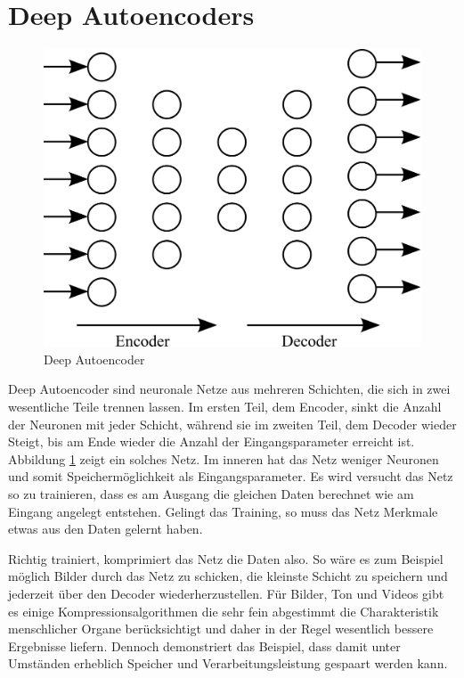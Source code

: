 \section{Deep Autoencoders}

\begin{figure}
	\centering
	\includegraphics[scale=1]{images/autoencoder.png}
	\caption{Deep Autoencoder}
	\label{fig:autoencoder}
\end{figure}

Deep Autoencoder sind neuronale Netze aus mehreren Schichten, die sich in zwei wesentliche Teile trennen lassen. Im ersten Teil, dem Encoder, sinkt die Anzahl der Neuronen mit jeder Schicht, während sie im zweiten Teil, dem Decoder wieder Steigt, bis am Ende wieder die Anzahl der Eingangsparameter erreicht ist. Abbildung \ref{fig:autoencoder} zeigt ein solches Netz. Im inneren hat das Netz weniger Neuronen und somit Speichermöglichkeit als Eingangsparameter. Es wird versucht das Netz so zu trainieren, dass es am Ausgang die gleichen Daten berechnet wie am Eingang angelegt entstehen. Gelingt das Training, so muss das Netz Merkmale etwas aus den Daten gelernt haben.

Richtig trainiert, komprimiert das Netz die Daten also. So wäre es zum Beispiel möglich Bilder durch das Netz zu schicken, die kleinste Schicht zu speichern und jederzeit über den Decoder wiederherzustellen. Für Bilder, Ton und Videos gibt es einige Kompressionsalgorithmen die sehr fein abgestimmt die Charakteristik menschlicher Organe berücksichtigt und daher in der Regel wesentlich bessere Ergebnisse liefern. Dennoch demonstriert das Beispiel, dass damit unter Umständen erheblich Speicher und Verarbeitungsleistung gespaart werden kann.

